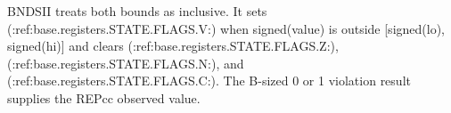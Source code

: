 BNDSII treats both bounds as inclusive. It sets (:ref:base.registers.STATE.FLAGS.V:) when signed(value) is outside [signed(lo), signed(hi)] and clears (:ref:base.registers.STATE.FLAGS.Z:), (:ref:base.registers.STATE.FLAGS.N:), and (:ref:base.registers.STATE.FLAGS.C:). The B-sized 0 or 1 violation result supplies the REPcc observed value.
